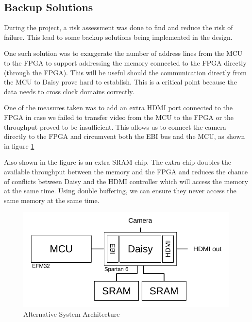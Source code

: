 \subsection{Backup Solutions} \label{subsec:RiskAssessment}
During the project, a risk assessment was done to find and reduce the risk of failure.
This lead to some backup solutions being implemented in the design.

One such solution was to exaggerate the number of address lines from the MCU to the FPGA to support addressing the memory connected to the FPGA directly (through the FPGA).
This will be useful should the communication directly from the MCU to Daisy prove hard to establish.
This is a critical point because the data needs to cross clock domains correctly.

One of the measures taken was to add an extra HDMI port connected to the FPGA in case we failed to transfer video from the MCU to the FPGA or the throughput proved to be insufficient.
This allows us to connect the camera directly to the FPGA and circumvent both the EBI bus and the MCU, as shown in figure \ref{fig:SystemArchitectureAlternative}

Also shown in the figure is an extra SRAM chip.
The extra chip doubles the available throughput between the memory and the FPGA and reduces the chance of conflicts between Daisy and the HDMI controller which will access the memory at the same time. Using double buffering, we can ensure they never access the same memory at the same time.

\begin{figure}
    \includegraphics{img/SystemArchitectureAlternative.pdf}
    \caption{Alternative System Architecture}
    \label{fig:SystemArchitectureAlternative}
\end{figure}
